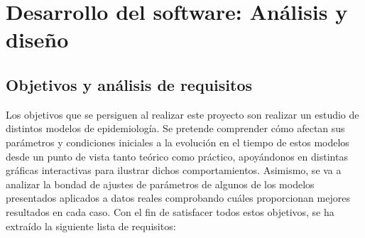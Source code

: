 
\chapter{Desarrollo del software: Análisis y diseño}

\section{Objetivos y análisis de requisitos}

Los objetivos que se persiguen al realizar este proyecto son realizar un estudio de distintos modelos de epidemiología. Se pretende comprender cómo afectan sus parámetros y condiciones iniciales a la evolución en el tiempo de estos modelos desde un punto de vista tanto teórico como práctico, apoyándonos en distintas gráficas interactivas para ilustrar dichos comportamientos. Asimismo, se va a analizar la bondad de ajustes de parámetros de algunos de los modelos presentados aplicados a datos reales comprobando cuáles proporcionan mejores resultados en cada caso. Con el fin de satisfacer todos estos objetivos, se ha extraído la siguiente lista de requisitos:

